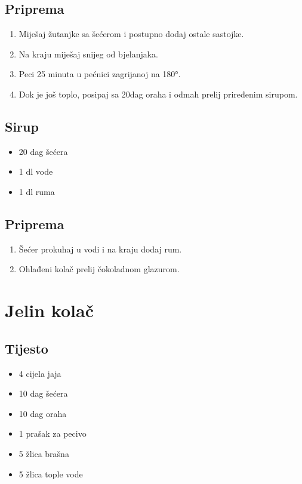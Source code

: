 \documentclass{article}
\begin{document}
\subsection{Priprema}
\begin{enumerate}
  \item Miješaj žutanjke sa šećerom i postupno dodaj ostale sastojke.
  \item Na kraju miješaj snijeg od bjelanjaka.
  \item Peci 25 minuta u pećnici zagrijanoj na 180°.
  \item Dok je još toplo, posipaj sa 20dag oraha i odmah prelij priređenim sirupom.
\end{enumerate}

\subsection{Sirup}
\begin{itemize}
  \item 20 dag šećera
  \item 1 dl vode
  \item 1 dl ruma
\end{itemize}

\subsection{Priprema}
\begin{enumerate}
  \item Šećer prokuhaj u vodi i na kraju dodaj rum.
  \item Ohlađeni kolač prelij čokoladnom glazurom.
\end{enumerate}

\section{Jelin kolač}
\subsection{Tijesto}
\begin{itemize}
  \item 4 cijela jaja
  \item 10 dag šećera
  \item 10 dag oraha
  \item 1 prašak za pecivo
  \item 5 žlica brašna
  \item 5 žlica tople vode
\end{itemize}
\end{document}
